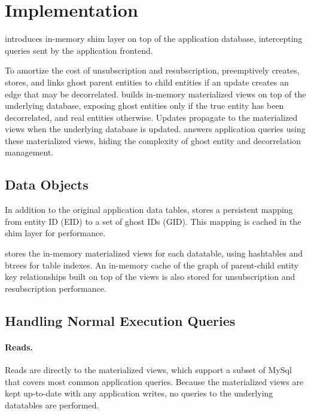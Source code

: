 \section{Implementation}

\sys{} introduces in-memory shim layer on top of the application database, intercepting queries sent by the
application frontend. 

To amortize the cost of unsubscription and resubscription, \sys{} preemptively creates, stores, and
links ghost parent entities to child entities if an update creates an edge that may be decorrelated.
\sys{} builds in-memory materialized views on top of the underlying database, exposing ghost
entities only if the true entity has been decorrelated, and real entities otherwise. Updates
propagate to the materialized views when the underlying database is updated. \sys{} answers
application queries using these materialized views, hiding the complexity of ghost entity and
decorrelation management.


\subsection{Data Objects}
In addition to the original application data tables, \sys{} stores a persistent mapping from entity
ID (EID) to a set of ghost IDs (GID). This mapping is cached in the shim layer for performance.

\sys{} stores the in-memory materialized views for each datatable, using hashtables and btrees for
table indexes. An in-memory cache of the graph of parent-child entity key relationships built on
top of the views is also stored for unsubscription and resubscription performance.

\subsection{Handling Normal Execution Queries}
\paragraph{Reads.}
Reads are directly to the materialized views, which support a subset of MySql that covers most
common application queries. Because the materialized views are kept up-to-date with any application
writes, no queries to the underlying datatables are performed.

